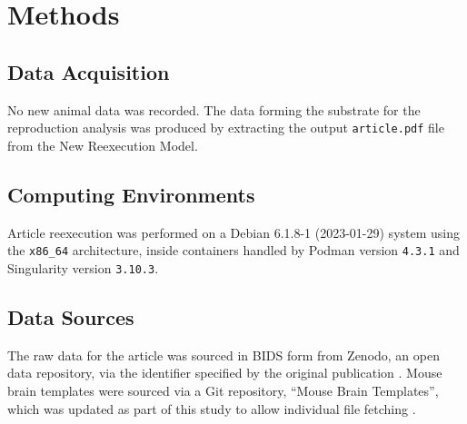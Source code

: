 \section{Methods}


\subsection{Data Acquisition}

No new animal data was recorded.
The data forming the substrate for the reproduction analysis was produced by extracting the output \texttt{article.pdf} file from the New Reexecution Model.

\subsection{Computing Environments}
Article reexecution was performed on a Debian 6.1.8-1 (2023-01-29) system using the \texttt{x86\_64} architecture, inside containers handled by Podman version \texttt{4.3.1} and Singularity version \texttt{3.10.3}.

\subsection{Data Sources}
The raw data for the article was sourced in BIDS form from Zenodo, an open data repository, via the identifier specified by the original publication \cite{opfvta_bidsdata}.
Mouse brain templates were sourced via a Git repository, “Mouse Brain Templates”, which was updated as part of this study to allow individual file fetching \cite{mbt10}.



